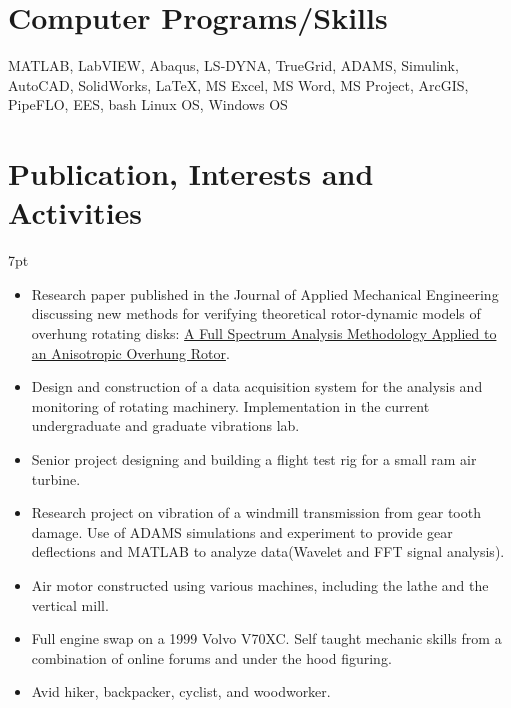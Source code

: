 \documentclass[10pt]{article} %
\begin{document}

\section{Computer Programs/Skills}

\begin{adjustwidth}{7pt}{7pt}
 \footnotesize{MATLAB, LabVIEW, Abaqus, LS-DYNA, TrueGrid, ADAMS, Simulink, AutoCAD, SolidWorks, {\fb \LaTeX}\setmainfont[SmallCapsFont=Fontin SmallCaps]{Fontin-Regular}, MS Excel, MS Word, MS Project, ArcGIS, PipeFLO, EES, bash Linux OS, Windows OS}
\end{adjustwidth}

\section{Publication, Interests and Activities}
\begin{adjustwidth}{}{7pt}
\begin{itemize}
	
	\item \footnotesize{Research paper published in the Journal of Applied Mechanical Engineering discussing new methods for verifying theoretical rotor-dynamic models of overhung rotating disks: \href{https://www.omicsgroup.org/journals/a-full-spectrum-analysis-methodology-applied-to-an-anisotropic-overhung-rotor-2168-9873-1000232.php?aid=81544}{A Full Spectrum Analysis Methodology Applied to an Anisotropic Overhung Rotor}}.
	\item \footnotesize{Design and construction of a data acquisition system for the analysis and  monitoring of rotating machinery. Implementation in the current undergraduate and graduate vibrations lab. }
	\item \footnotesize{Senior project designing and building a flight test rig for a small ram air turbine.}
	\item \footnotesize{Research project on vibration of a windmill transmission from gear tooth damage. Use of ADAMS simulations and experiment to provide gear deflections and MATLAB to analyze data(Wavelet and FFT signal analysis).}
	\item \footnotesize{Air motor constructed using various machines, including the lathe and the vertical mill.}
	\item \footnotesize{Full engine swap on a 1999 Volvo V70XC. Self taught mechanic skills from a combination of online forums and under the hood figuring. }
	\item\footnotesize{Avid hiker, backpacker, cyclist, and woodworker.}

\end{itemize}
\end{adjustwidth}
\end{document}
